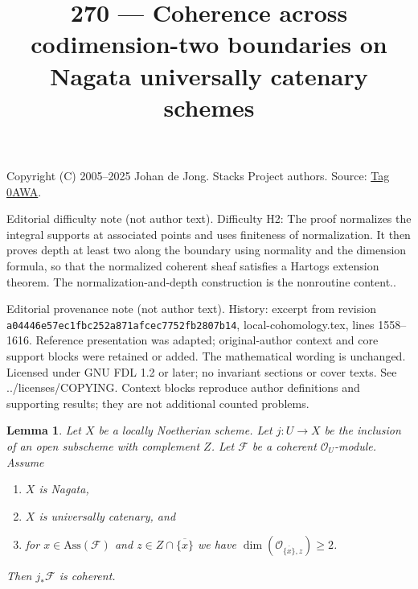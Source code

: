 \documentclass{amsart}
\theoremstyle{plain}
\newtheorem{lemma}[subsection]{Lemma}
\theoremstyle{definition}
\theoremstyle{remark}
\numberwithin{equation}{subsection}
\begin{document}
\title[Stacks Project, Tag 0AWA]{270 --- Coherence across codimension-two boundaries on Nagata universally catenary schemes}
\maketitle
\noindent Copyright (C) 2005--2025 Johan de Jong. Stacks Project authors. Source: \href{https://stacks.math.columbia.edu/tag/0AWA}{Tag 0AWA}.

\noindent Editorial difficulty note (not author text). Difficulty H2: The proof normalizes the integral supports at associated points and uses finiteness of normalization. It then proves depth at least two along the boundary using normality and the dimension formula, so that the normalized coherent sheaf satisfies a Hartogs extension theorem. The normalization-and-depth construction is the nonroutine content..

\noindent Editorial provenance note (not author text). History: excerpt from revision \texttt{a0444\allowbreak 6e57e\allowbreak c1fbc\allowbreak 252a8\allowbreak 71afc\allowbreak ec775\allowbreak 2fb28\allowbreak 07b14}, local-cohomology.tex, lines 1558--1616. Reference presentation was adapted; original-author context and core support blocks were retained or added. The mathematical wording is unchanged. Licensed under GNU FDL 1.2 or later; no invariant sections or cover texts. See ../licenses/COPYING. Context blocks reproduce author definitions and supporting results; they are not additional counted problems.

\begin{lemma}
\label{lemma-finiteness-pushforward}
Let $X$ be a locally Noetherian scheme.
Let $j : U \to X$ be the inclusion of an
open subscheme with complement $Z$. Let $\mathcal{F}$ be a coherent
$\mathcal{O}_U$-module. Assume
\begin{enumerate}
\item $X$ is Nagata,
\item $X$ is universally catenary, and
\item for $x \in \text{Ass}(\mathcal{F})$ and
$z \in Z \cap \overline{\{x\}}$ we have
$\dim(\mathcal{O}_{\overline{\{x\}}, z}) \geq 2$.
\end{enumerate}
Then $j_*\mathcal{F}$ is coherent.
\end{lemma}
\end{document}
